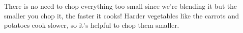 \begin{recipe}
\hint
{
There is no need to chop everything too small since we're blending it but the smaller you chop it, the faster it cooks! Harder vegetables like the carrots and potatoes cook slower, so it's helpful to chop them smaller.\\
}

\end{recipe}

